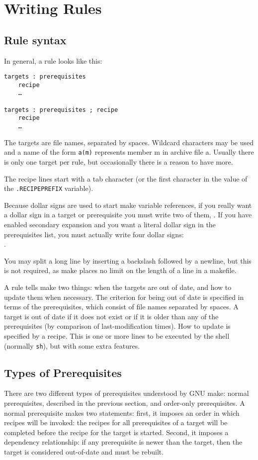 
\section{Writing Rules}
\subsection{Rule syntax}
In general, a rule looks like this:

\begin{verbatim}
targets : prerequisites
    recipe
    …

targets : prerequisites ; recipe
    recipe
    …
\end{verbatim}

The targets are file names, separated by spaces. Wildcard characters may be used and a name of the form \texttt{a(m)} represents member m in archive file a. Usually there is only one target per rule, but occasionally there is a reason to have more.

The recipe lines start with a tab character (or the first character in the value of the \texttt{.RECIPEPREFIX} variable).

Because dollar signs are used to start make variable references, if you really want a dollar sign in a target or prerequisite you must write two of them, \texttt{$$}. If you have enabled secondary expansion and you want a literal dollar sign in the prerequisites list, you must actually write four dollar signs: \texttt{$$$$}.

You may split a long line by inserting a backslash followed by a newline, but this is not required, as make places no limit on the length of a line in a makefile.

A rule tells make two things: when the targets are out of date, and how to update them when necessary.
The criterion for being out of date is specified in terms of the prerequisites, which consist of file names separated by spaces.
A target is out of date if it does not exist or if it is older than any of the prerequisites (by comparison of last-modification times).
How to update is specified by a recipe. This is one or more lines to be executed by the shell (normally \texttt{sh}), but with some extra features.

\subsection{Types of Prerequisites}
There are two different types of prerequisites understood by GNU make: normal prerequisites, described in the previous section, and order-only prerequisites. A normal prerequisite makes two statements: first, it imposes an order in which recipes will be invoked: the recipes for all prerequisites of a target will be completed before the recipe for the target is started. Second, it imposes a dependency relationship: if any prerequisite is newer than the target, then the target is considered out-of-date and must be rebuilt.

